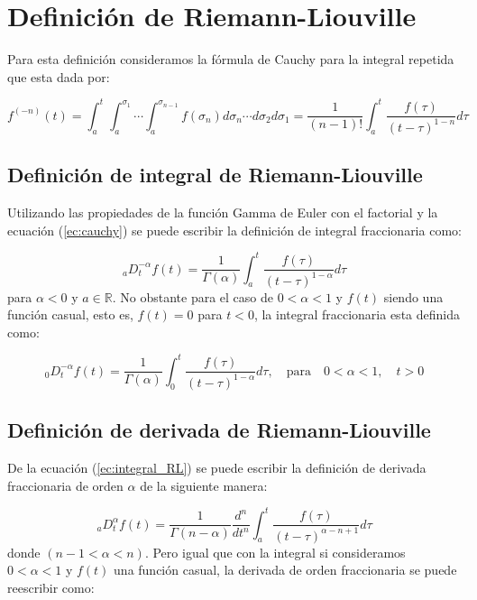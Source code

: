 	\section{Definición de Riemann-Liouville}
	
	Para esta definición consideramos la fórmula de Cauchy para la integral repetida que esta dada por:
	
	\begin{equation}
		f^{(-n)} (t) = \int_{a}^{t} \int_{a}^{\sigma_{1}}  \cdots \int_{a}^{\sigma_{n-1}} f(\sigma_{n}) d\sigma_{n} \cdots d\sigma_{2} d\sigma_{1} = \frac{1}{(n - 1)!} \int^{t}_{a} \frac{f(\tau)}{(t - \tau)^{1 - n}} d \tau
		\label{ec:cauchy}
	\end{equation}

		\subsection{Definición de integral de Riemann-Liouville}
		
	Utilizando las propiedades de la función Gamma de Euler con el factorial y la ecuación (\ref{ec:cauchy}) se puede escribir la definición de integral fraccionaria como:

	\begin{equation}
		_{a}D_{t}^{-\alpha} f(t) = \frac{1}{\Gamma( \alpha)} \int_{a}^{t} \frac{f(\tau)}{(t - \tau)^{ 1 - \alpha}} d \tau
		\label{ec:integral_RL}
	\end{equation}
	para $\alpha<0$ y $a \in \mathbb{R}$. No obstante para el caso de $0 < \alpha < 1$ y $f(t)$ siendo una función casual, esto es, $f(t)=0$ para $t<0$, la integral fraccionaria esta definida como:
	
	\begin{equation}
		_{0}D_{t}^{-\alpha} f(t) = \frac{1}{\Gamma( \alpha)} \int_{0}^{t} \frac{f(\tau)}{(t - \tau)^{ 1 - \alpha}} d \tau , \quad \mathrm{para} \quad 0 < \alpha < 1, \quad t > 0
	\end{equation}
		
		\subsection{Definición de derivada de Riemann-Liouville}
		
	De la ecuación (\ref{ec:integral_RL}) se puede escribir la definición de derivada fraccionaria de orden $\alpha$ de la siguiente manera:
	
	\begin{equation}
		_{a}D_{t}^{\alpha} f(t) = \frac{1}{\Gamma(n - \alpha)} \frac{d^{n}}{dt^{n}} \int_{a}^{t} \frac{f(\tau)}{(t - \tau)^{\alpha - n + 1}} d \tau
	\end{equation}
	donde $(n-1 < \alpha < n)$. Pero igual que con la integral si consideramos $0 < \alpha < 1$ y $f(t)$  una función casual, la derivada de orden fraccionaria se puede reescribir como:
	
